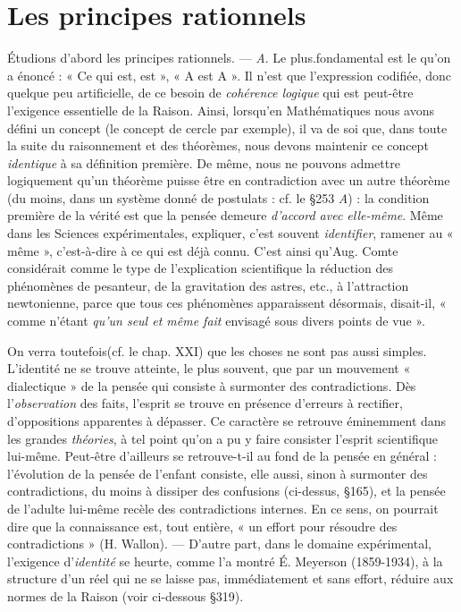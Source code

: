 \section{Les principes rationnels}%
Étudions d’abord les principes
rationnels. — {\it A}. Le plus.fondamental est le  qu’on a
énoncé : « Ce qui est, est », « A est A ». Il n’est que l’expression codifiée,
donc quelque peu artificielle, de ce besoin de {\it cohérence logique} qui est
peut-être l’exigence essentielle de la Raison. Ainsi, lorsqu’en Mathématiques nous avons défini un concept (le concept de cercle par
exemple), il va de soi que, dans toute la suite du raisonnement et
des théorèmes, nous devons maintenir ce concept {\it identique} à sa définition première. De même, nous ne pouvons admettre logiquement
qu’un théorème puisse être en contradiction avec un autre théorème
(du moins, dans un système donné de postulats : cf. le \S 253 {\it A}) :
la condition première de la vérité est que la pensée demeure {\it d'accord
avec elle-même}. Même dans les Sciences expérimentales, expliquer,
c’est souvent {\it identifier}, ramener au « même », c’est-à-dire à ce qui
est déjà connu. C’est ainsi qu'Aug. Comte considérait comme le
type de l'explication scientifique la réduction des phénomènes de
pesanteur, de la gravitation des astres, etc., à l’attraction newtonienne, parce que tous ces phénomènes apparaissent désormais,
disait-il, « comme n’étant {\it qu’un seul et même fait} envisagé sous divers
points de vue ».

On verra toutefois(cf. le chap. XXI) que les choses ne sont pas aussi
simples. L'identité ne se trouve atteinte, le plus souvent, que par un
mouvement « dialectique » de la pensée qui consiste à surmonter des
contradictions. Dès l'{\it observation} des faits, l'esprit se trouve en présence d'erreurs à rectifier, d’oppositions apparentes à dépasser.
Ce caractère se retrouve éminemment dans les grandes {\it théories}, à tel
point qu’on a pu y faire consister l’esprit scientifique lui-même.
Peut-être d’ailleurs se retrouve-t-il au fond de la pensée en général :
l’évolution de la pensée de l’enfant consiste, elle aussi, sinon à surmonter des contradictions, du moins à dissiper des confusions
(ci-dessus, \S 165), et la pensée de l’adulte lui-même recèle des contradictions internes. En ce sens, on pourrait dire que la connaissance
est, tout entière, « un effort pour résoudre des contradictions »
(H. Wallon). — D’autre part, dans le domaine expérimental, l’exigence d'{\it identité} se heurte, comme l’a montré É. Meyerson (1859-1934),
à la structure d’un réel qui ne se laisse pas, immédiatement et sans
effort, réduire aux normes de la Raison (voir ci-dessous \S 319).

